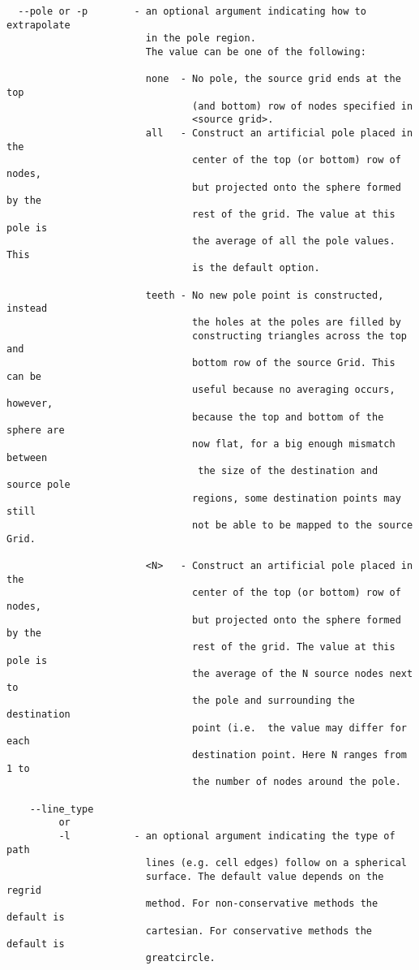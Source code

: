 \begin{verbatim}
  --pole or -p        - an optional argument indicating how to extrapolate 
                        in the pole region. 
                        The value can be one of the following:

                        none  - No pole, the source grid ends at the top
                                (and bottom) row of nodes specified in
                                <source grid>.
                        all   - Construct an artificial pole placed in the
                                center of the top (or bottom) row of nodes,
                                but projected onto the sphere formed by the
                                rest of the grid. The value at this pole is
                                the average of all the pole values. This
                                is the default option.

                        teeth - No new pole point is constructed, instead
                                the holes at the poles are filled by
                                constructing triangles across the top and
                                bottom row of the source Grid. This can be
                                useful because no averaging occurs, however,
                                because the top and bottom of the sphere are
                                now flat, for a big enough mismatch between
                                 the size of the destination and source pole
                                regions, some destination points may still
                                not be able to be mapped to the source Grid.

                        <N>   - Construct an artificial pole placed in the
                                center of the top (or bottom) row of nodes,
                                but projected onto the sphere formed by the
                                rest of the grid. The value at this pole is
                                the average of the N source nodes next to
                                the pole and surrounding the destination
                                point (i.e.  the value may differ for each
                                destination point. Here N ranges from 1 to
                                the number of nodes around the pole.

    --line_type 
         or
         -l           - an optional argument indicating the type of path
                        lines (e.g. cell edges) follow on a spherical
                        surface. The default value depends on the regrid
                        method. For non-conservative methods the default is
                        cartesian. For conservative methods the default is
                        greatcircle. 


\end{verbatim}
